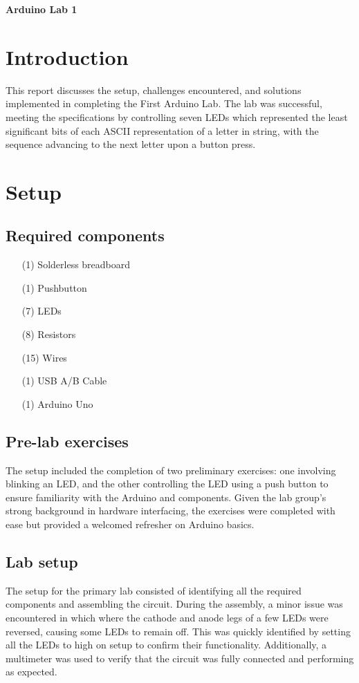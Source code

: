 \documentclass[fleqn]{article}
\begin{document}
\pagestyle{fancy}
\fancyhead{}
\fancyhead[R]{\thepage}
\fancyfoot{}

\begin{center}
    \Large{\textbf{Arduino Lab 1}}\\
\end{center}
\vspace{0.25in}

\section{Introduction}
This report discusses the setup, challenges encountered, and solutions implemented in completing the First Arduino Lab. The lab was successful, meeting the specifications by controlling seven LEDs which represented the least significant bits of each ASCII representation of a letter in string, with the sequence advancing to the next letter upon a button press.
\section{Setup}
\subsection{Required components}
\begin{itemize}
    \item[(1)] Solderless breadboard
    \item[(1)] Pushbutton
    \item[(7)] LEDs
    \item[(8)] Resistors
    \item[(15)] Wires
    \item[(1)] USB A/B Cable
    \item[(1)] Arduino Uno
\end{itemize}
\subsection{Pre-lab exercises}
The setup included the completion of two preliminary exercises: one involving blinking an LED, and the other controlling the LED using a push button to ensure familiarity with the Arduino and components. Given the lab group’s strong background in hardware interfacing, the exercises were completed with ease but provided a welcomed refresher on Arduino basics. 
\subsection{Lab setup}
The setup for the primary lab consisted of identifying all the required components and assembling the circuit. During the assembly, a minor issue was encountered in which where the cathode and anode legs of a few LEDs were reversed, causing some LEDs to remain off. This was quickly identified by setting all the LEDs to high on setup to confirm their functionality. Additionally, a multimeter was used to verify that the circuit was fully connected and performing as expected.
\end{document}
